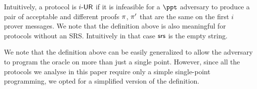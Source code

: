 %


Intuitively, a protocol is ${i\text{-}\mathsf{UR}}$ if it is infeasible for a $\ppt$ adversary to produce a pair of acceptable and different proofs $\pi$, $\pi'$ that are the same on the first $i$ prover messages.  We note that the definition above is also meaningful for protocols without an SRS. Intuitively in that case $\mathsf{srs}$ is the empty string.

We note that the definition above can be easily generalized to allow the adversary to program the oracle on more than just a single point. However, since all the protocols we analyse in this paper require only a simple single-point programming, we opted for a simplified version of the definition.
  

